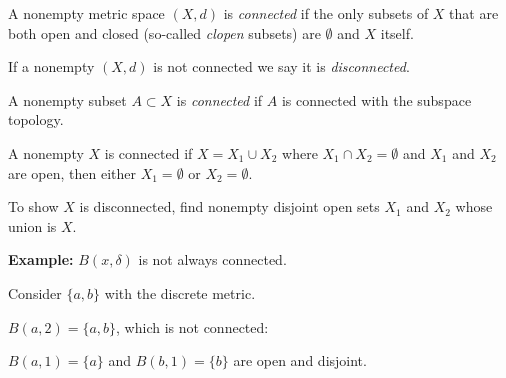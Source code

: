 \documentclass[10pt,aspectratio=149]{beamer}
\begin{document}
\begin{frame}

\begin{definition}
A nonempty
metric space $(X,d)$ is \emph{connected} if the
only subsets of $X$ that are both open and closed (so-called
\emph{clopen} subsets) are $\emptyset$ and $X$ itself.

\pause
\medskip

If a nonempty $(X,d)$ is not connected we say it is
\emph{disconnected}.

\pause
\medskip

A nonempty subset $A \subset X$ is \emph{connected} if
$A$ is connected with the subspace topology.
\end{definition}

\pause
A nonempty $X$ is connected if
$X = X_1 \cup X_2$ where $X_1 \cap X_2 = \emptyset$ and $X_1$ and $X_2$ are
open, then either $X_1 = \emptyset$ or $X_2 = \emptyset$.

\pause
\medskip

To show $X$ is disconnected, find nonempty
disjoint open sets $X_1$ and
$X_2$ whose union is $X$.

\pause
\medskip

\textbf{Example:}
$B(x,\delta)$ is not always connected.

\pause
Consider $\{ a, b\}$ with the discrete metric.

\pause
\thus \quad $B(a,2) = \{ a , b \}$, which is not
connected:

\pause
$B(a,1) = \{ a \}$ and 
$B(b,1) = \{ b \}$ are open and disjoint.

\end{frame}
\end{document}
